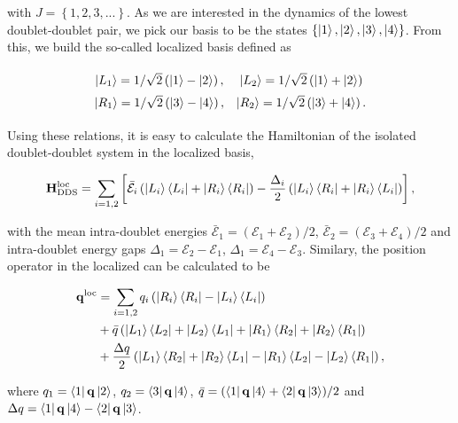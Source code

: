 \documentclass[preprint]{revtex4-2}
\begin{document}
with $J=\left\{ 1, 2, 3, ... \right\}$. As we are interested in the dynamics of the lowest doublet-doublet
pair, we pick our basis to be the states $\left\{ \ket{1},\ket{2},\ket{3},\ket{4} \right\}$. From this, 
we build the so-called localized basis defined as

\begin{equation}
\def\arraystretch{1.5}
\begin{array}{c c}
    \ket{L_1}=1/\sqrt{2} \left(\ket{1}-\ket{2}\right),
    & \ket{L_2}=1/\sqrt{2} \left(\ket{1}+\ket{2}\right)\\
    \ket{R_1}=1/\sqrt{2} \left(\ket{3}-\ket{4}\right),
    & \ket{R_2}=1/\sqrt{2} \left(\ket{3}+\ket{4}\right). \\
\end{array}
\end{equation}

Using these relations, it is easy to calculate the Hamiltonian of the isolated doublet-doublet system 
in the localized basis,

\begin{equation}
    \mathbf{H}^{\text{loc}}_{\text{DDS}} = \sum_{i=1,2} \left[ \bar{\mathcal{E}}_i \left( 
    \ket{L_i}\bra{L_i}+\ket{R_i}\bra{R_i} \right)- 
    \frac{\Delta_i}{2}\left( \ket{L_i}\bra{R_i}+\ket{R_i}\bra{L_i} \right) \right], 
\end{equation}

with the mean intra-doublet energies $\bar{\mathcal{E}}_1=(\mathcal{E}_1+\mathcal{E}_2)/2$, $\bar{\mathcal{E}}_2=(\mathcal{E}_3+\mathcal{E}_4)/2$
and intra-doublet energy gaps $\Delta_1=\mathcal{E}_2-\mathcal{E}_1$, $\Delta_1=\mathcal{E}_4-\mathcal{E}_3$.
Similary, the position operator in the localized can be calculated to be

\begin{equation}\label{position_operator_localized_basis}
\begin{split}
    \mathbf{q}^{\text{loc}} &= \sum_{i=1,2} q_i \left( \ket{R_i}\bra{R_i}- \ket{L_i}\bra{L_i} \right) \\
    &+ \bar{q} \left( \ket{L_1}\bra{L_2}+\ket{L_2}\bra{L_1}+\ket{R_1}\bra{R_2}+\ket{R_2}\bra{R_1} \right) \\
    &+ \frac{\Delta q}{2} \left( \ket{L_1}\bra{R_2}+\ket{R_2}\bra{L_1}-\ket{R_1}\bra{L_2}-\ket{L_2}\bra{R_1} \right),
\end{split}
\end{equation}

where $q_1 = \bra{1}\mathbf{q}\ket{2}$, $q_2 = \bra{3}\mathbf{q}\ket{4}$, 
$\bar{q}=(\bra{1}\mathbf{q}\ket{4}+\bra{2}\mathbf{q}\ket{3})/2$ and \\
$\Delta q=\bra{1}\mathbf{q}\ket{4}-\bra{2}\mathbf{q}\ket{3}$. 
\end{document}
